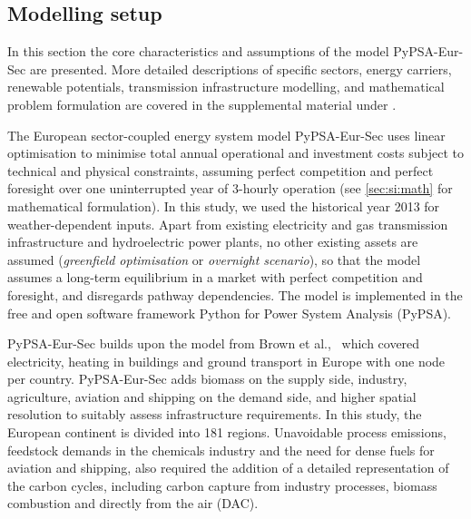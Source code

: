 \subsection*{Modelling setup}

In this section the core characteristics and assumptions of the model
PyPSA-Eur-Sec are presented. More detailed descriptions of specific sectors,
energy carriers, renewable potentials, transmission infrastructure modelling,
and mathematical problem formulation are covered in the supplemental material
under .

The European sector-coupled energy system model PyPSA-Eur-Sec uses linear
optimisation to minimise total annual operational and investment costs
subject to technical and physical constraints, assuming perfect competition and
perfect foresight over one uninterrupted year of 3-hourly operation (see
\cref{sec:si:math} for mathematical formulation). In this study, we used the
historical year 2013 for weather-dependent inputs. Apart from existing
electricity and gas transmission infrastructure and hydroelectric power plants,
no other existing assets are assumed (\textit{greenfield optimisation} or
\textit{overnight scenario}), so that the model assumes a long-term equilibrium
in a market with perfect competition and foresight, and disregards pathway
dependencies. The model is implemented in the free and open software framework
Python for Power System Analysis (PyPSA).\cite{brownPyPSAPython2018}

PyPSA-Eur-Sec builds upon the model from Brown et
al.,~\cite{brownSynergiesSector2018} which covered electricity, heating in
buildings and ground transport in Europe with one node per country.
PyPSA-Eur-Sec adds biomass on the supply side, industry, agriculture, aviation
and shipping on the demand side, and higher spatial resolution to suitably
assess infrastructure requirements. In this study, the European continent is
divided into 181 regions. Unavoidable process emissions, feedstock demands in
the chemicals industry and the need for dense fuels for aviation and shipping,
also required the addition of a detailed representation of the carbon cycles,
including carbon capture from industry processes, biomass combustion and
directly from the air (DAC).

